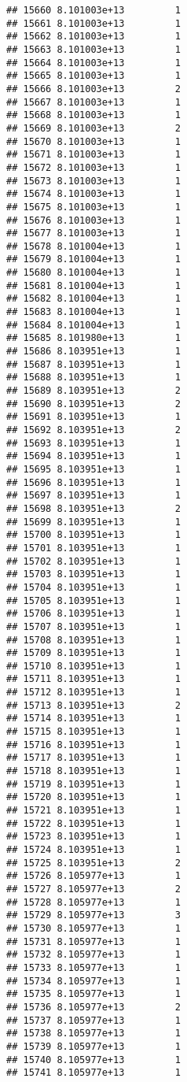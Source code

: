 \documentclass[
]{article}
\begin{document}
\begin{verbatim}
## 15660 8.101003e+13         1
## 15661 8.101003e+13         1
## 15662 8.101003e+13         1
## 15663 8.101003e+13         1
## 15664 8.101003e+13         1
## 15665 8.101003e+13         1
## 15666 8.101003e+13         2
## 15667 8.101003e+13         1
## 15668 8.101003e+13         1
## 15669 8.101003e+13         2
## 15670 8.101003e+13         1
## 15671 8.101003e+13         1
## 15672 8.101003e+13         1
## 15673 8.101003e+13         1
## 15674 8.101003e+13         1
## 15675 8.101003e+13         1
## 15676 8.101003e+13         1
## 15677 8.101003e+13         1
## 15678 8.101004e+13         1
## 15679 8.101004e+13         1
## 15680 8.101004e+13         1
## 15681 8.101004e+13         1
## 15682 8.101004e+13         1
## 15683 8.101004e+13         1
## 15684 8.101004e+13         1
## 15685 8.101980e+13         1
## 15686 8.103951e+13         1
## 15687 8.103951e+13         1
## 15688 8.103951e+13         1
## 15689 8.103951e+13         2
## 15690 8.103951e+13         2
## 15691 8.103951e+13         1
## 15692 8.103951e+13         2
## 15693 8.103951e+13         1
## 15694 8.103951e+13         1
## 15695 8.103951e+13         1
## 15696 8.103951e+13         1
## 15697 8.103951e+13         1
## 15698 8.103951e+13         2
## 15699 8.103951e+13         1
## 15700 8.103951e+13         1
## 15701 8.103951e+13         1
## 15702 8.103951e+13         1
## 15703 8.103951e+13         1
## 15704 8.103951e+13         1
## 15705 8.103951e+13         1
## 15706 8.103951e+13         1
## 15707 8.103951e+13         1
## 15708 8.103951e+13         1
## 15709 8.103951e+13         1
## 15710 8.103951e+13         1
## 15711 8.103951e+13         1
## 15712 8.103951e+13         1
## 15713 8.103951e+13         2
## 15714 8.103951e+13         1
## 15715 8.103951e+13         1
## 15716 8.103951e+13         1
## 15717 8.103951e+13         1
## 15718 8.103951e+13         1
## 15719 8.103951e+13         1
## 15720 8.103951e+13         1
## 15721 8.103951e+13         1
## 15722 8.103951e+13         1
## 15723 8.103951e+13         1
## 15724 8.103951e+13         1
## 15725 8.103951e+13         2
## 15726 8.105977e+13         1
## 15727 8.105977e+13         2
## 15728 8.105977e+13         1
## 15729 8.105977e+13         3
## 15730 8.105977e+13         1
## 15731 8.105977e+13         1
## 15732 8.105977e+13         1
## 15733 8.105977e+13         1
## 15734 8.105977e+13         1
## 15735 8.105977e+13         1
## 15736 8.105977e+13         2
## 15737 8.105977e+13         1
## 15738 8.105977e+13         1
## 15739 8.105977e+13         1
## 15740 8.105977e+13         1
## 15741 8.105977e+13         1

\end{verbatim}
\end{document}
